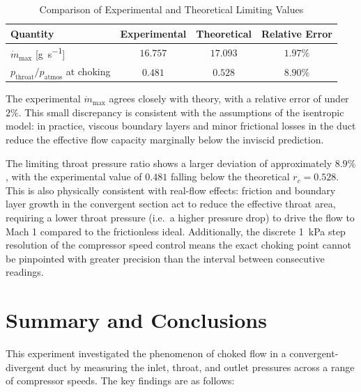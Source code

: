 \begin{table}[H]
    \centering
    \caption{Comparison of Experimental and Theoretical Limiting Values}
    \begin{tabular}{|l|c|c|c|}
        \hline
        Quantity
            & Experimental
            & Theoretical
            & Relative Error \\ \hline \hline
        \( \dot{m}_\text{max} \) [\unit{\g\per\s}]
            & \( 16.757 \)
            & \( 17.093 \)
            & \( 1.97\% \) \\ \hline
        \( p_\text{throat} / p_\text{atmos} \) at choking
            & \( 0.481 \)
            & \( 0.528 \)
            & \( 8.90\% \) \\ \hline
    \end{tabular}
    \label{tab:analysis/theory-comparison}
\end{table}

The experimental \( \dot{m}_\text{max} \) agrees closely with theory, with a relative error of under \( 2\% \). This small discrepancy is consistent with the assumptions of the isentropic model: in practice, viscous boundary layers and minor frictional losses in the duct reduce the effective flow capacity marginally below the inviscid prediction.

The limiting throat pressure ratio shows a larger deviation of approximately \( 8.9\% \), with the experimental value of \( 0.481 \) falling below the theoretical \( r_c = 0.528 \). This is also physically consistent with real-flow effects: friction and boundary layer growth in the convergent section act to reduce the effective throat area, requiring a lower throat pressure (i.e.\ a higher pressure drop) to drive the flow to Mach 1 compared to the frictionless ideal. Additionally, the discrete \qty{1}{\kPa} step resolution of the compressor speed control means the exact choking point cannot be pinpointed with greater precision than the interval between consecutive readings.

\section{Summary and Conclusions} \label{sec:summary}

This experiment investigated the phenomenon of choked flow in a convergent-divergent duct by measuring the inlet, throat, and outlet pressures across a range of compressor speeds. The key findings are as follows:

